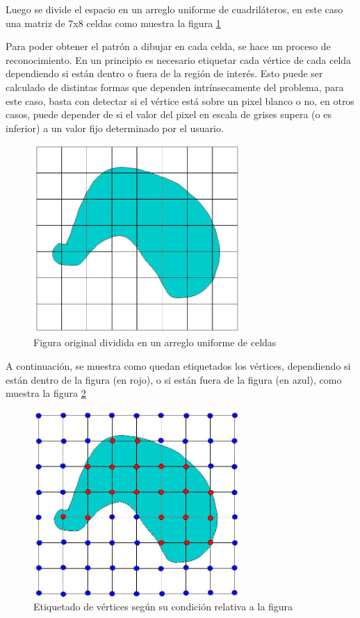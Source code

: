 Luego se divide el espacio en un arreglo uniforme de cuadriláteros, en este caso una
matriz de 7x8 celdas como muestra la figura \ref{f:estadoDelArte:division}

Para poder obtener el patrón a dibujar en cada celda, se hace un proceso de
reconocimiento. En un principio es necesario etiquetar cada vértice de cada celda dependiendo si
están dentro o fuera de la región de interés. Esto puede ser calculado de distintas formas que
dependen intrínsecamente del problema, para este caso, basta con detectar si el vértice está sobre
un pixel blanco o no, en otros casos, puede depender de si el valor del pixel en escala de
grises supera (o es inferior) a un valor fijo determinado por el usuario.

\begin{figure}
	\centering
		\includegraphics[width=0.7\textwidth]{images/marchingsquare/division.jpg}
	\caption{Figura original dividida en un arreglo uniforme de celdas}
	\label{f:estadoDelArte:division}
\end{figure}

A continuación, se muestra como quedan etiquetados los vértices, dependiendo si están
dentro de la figura (en rojo), o si están fuera de la figura (en azul), como muestra la figura \ref{f:estadoDelArte:labeledobj}

\begin{figure}
	\centering
		\includegraphics[width=0.7\textwidth]{images/marchingsquare/labeledobj.jpg}
	\caption{Etiquetado de vértices según su condición relativa a la figura}
	\label{f:estadoDelArte:labeledobj}
\end{figure}

